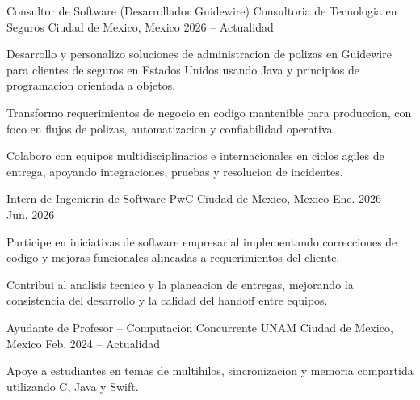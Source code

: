 \begin{cventries}

  \cventry
    {Consultor de Software (Desarrollador Guidewire)}
    {Consultoria de Tecnologia en Seguros}
    {Ciudad de Mexico, Mexico}
    {2026 -- Actualidad}
    {
      \begin{cvitems}
        \item {Desarrollo y personalizo soluciones de administracion de polizas en Guidewire para clientes de seguros en Estados Unidos usando Java y principios de programacion orientada a objetos.}
        \item {Transformo requerimientos de negocio en codigo mantenible para produccion, con foco en flujos de polizas, automatizacion y confiabilidad operativa.}
        \item {Colaboro con equipos multidisciplinarios e internacionales en ciclos agiles de entrega, apoyando integraciones, pruebas y resolucion de incidentes.}
      \end{cvitems}
    }

  \cventry
    {Intern de Ingenieria de Software}
    {PwC}
    {Ciudad de Mexico, Mexico}
    {Ene. 2026 -- Jun. 2026}
    {
      \begin{cvitems}
        \item {Participe en iniciativas de software empresarial implementando correcciones de codigo y mejoras funcionales alineadas a requerimientos del cliente.}
        \item {Contribui al analisis tecnico y la planeacion de entregas, mejorando la consistencia del desarrollo y la calidad del handoff entre equipos.}
      \end{cvitems}
    }

  \cventry
    {Ayudante de Profesor -- Computacion Concurrente}
    {UNAM}
    {Ciudad de Mexico, Mexico}
    {Feb. 2024 -- Actualidad}
    {
      \begin{cvitems}
        \item {Apoye a estudiantes en temas de multihilos, sincronizacion y memoria compartida utilizando C, Java y Swift.}
      \end{cvitems}
    }

\end{cventries}
